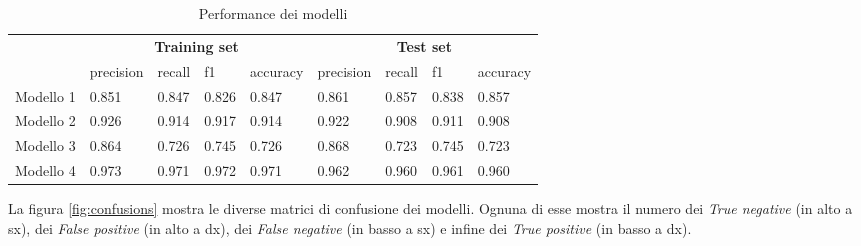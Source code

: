 \documentclass[a4paper]{article}
\begin{document}
\begin{table}[h]
\centering
\begingroup
\setlength{\tabcolsep}{10pt} %
\renewcommand{\arraystretch}{1.5} %

\begin{tabularx}{\textwidth}{|l|XXXX|XXXX|}
\hline
          & \multicolumn{4}{c|}{\textbf{Training set}} & \multicolumn{4}{c|}{\textbf{Test set}} \\
          & precision  & recall  & f1     & accuracy  & precision & recall & f1    & accuracy \\
Modello 1 & 0.851      & 0.847   & 0.826  & 0.847     & 0.861     & 0.857  & 0.838 & 0.857    \\
Modello 2 & 0.926      & 0.914   & 0.917  & 0.914     & 0.922     & 0.908  & 0.911 & 0.908    \\
Modello 3 & 0.864      & 0.726   & 0.745  & 0.726     & 0.868     & 0.723  & 0.745 & 0.723    \\
Modello 4 & 0.973      & 0.971   & 0.972  & 0.971     & 0.962     & 0.960  & 0.961 & 0.960   \\\hline
\end{tabularx}
\endgroup
\caption{Performance dei modelli}
\label{tab:performances}
\end{table}

\noindent La figura \ref{fig:confusions} mostra le diverse matrici di confusione dei modelli. Ognuna di esse mostra il numero dei \textit{True negative} (in alto a sx), dei \textit{False positive} (in alto a dx), dei \textit{False negative} (in basso a sx) e infine dei \textit{True positive} (in basso a dx).
\end{document}
